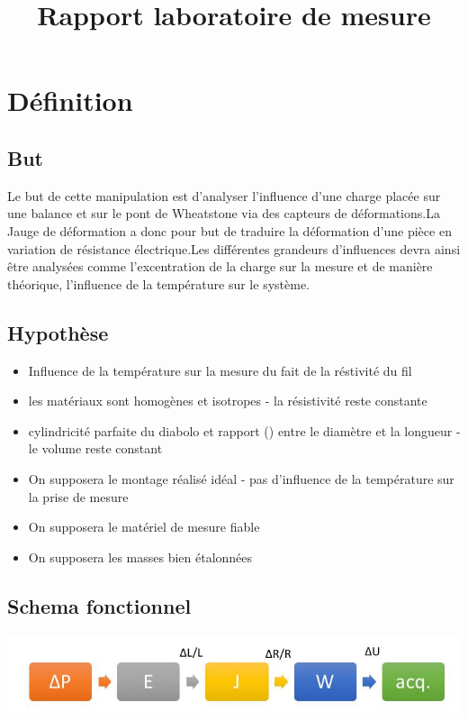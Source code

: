 \documentclass[11pt,a4paper]{report}
\begin{document}
\title{Rapport laboratoire de mesure}
\section*{Définition}	
\subsection*{But}

Le but de cette manipulation est d'analyser l'influence d'une charge placée sur une balance et sur le pont de Wheatstone via des capteurs de déformations.La Jauge de déformation a donc pour but de traduire la déformation d'une pièce en variation de résistance électrique.Les différentes grandeurs d'influences devra ainsi être analysées comme l'excentration de la charge sur la mesure et de manière théorique, l'influence de la température sur le système.
\subsection*{Hypothèse}
\begin{itemize}
\item Influence de la température sur la mesure du fait de la réstivité du fil 
\item les matériaux sont homogènes et isotropes - la résistivité reste constante
\item cylindricité parfaite du diabolo et rapport () entre le diamètre et la longueur - le volume reste constant
\item On supposera le montage réalisé idéal - pas d'influence de la température sur la prise de mesure
\item On supposera le matériel de mesure fiable
\item On supposera les masses bien étalonnées
\end{itemize}	
\subsection*{Schema fonctionnel}
\begin{center}
\includegraphics[scale=0.5]{image1.jpg} 
\end{center}
\end{document}
